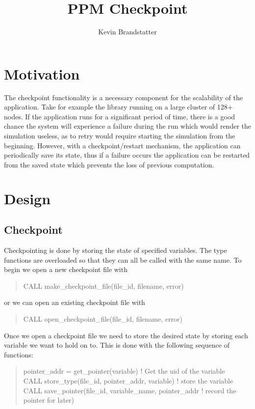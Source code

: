 \documentclass{article}
\title{PPM Checkpoint}
\author{Kevin Brandstatter}
\begin{document}
\maketitle
\section{Motivation}
The checkpoint functionality is a necessary component for the scalability of the application. Take for example the library running on a large cluster of 128+ nodes. If the application runs for a significant period of time, there is a good chance the system will experience a failure during the run which would render the simulation useless, as to retry would require starting the simulation from the beginning. However, with a checkpoint/restart mechanism, the application can periodically save its state, thus if a failure occurs the application can be restarted from the saved state which prevents the loss of previous computation.
\section{Design}
\subsection{Checkpoint}
Checkpointing is done by storing the state of specified variables. The type functions are overloaded so that they can all be called with the same name. To begin we open a new checkpoint file with
\begin{quote}
CALL make\_checkpoint\_file(file\_id, filename, error)
\end{quote}
or we can open an existing checkpoint file with
\begin{quote}
   CALL open\_checkpoint\_file(file\_id, filename, error)
\end{quote}

Once we open a checkpoint file we need to store the desired state by storing each variable we want to hold on to. This is done with the following sequence of functions:
\begin{quote}
   pointer\_addr = get\_pointer(variable) ! Get the uid of the variable \\
   CALL store\_type(file\_id, pointer\_addr, variable) ! store the variable \\
   CALL save\_pointer(file\_id, variable\_name, pointer\_addr ! record the pointer for later) \\
\end{quote}
\end{document}
